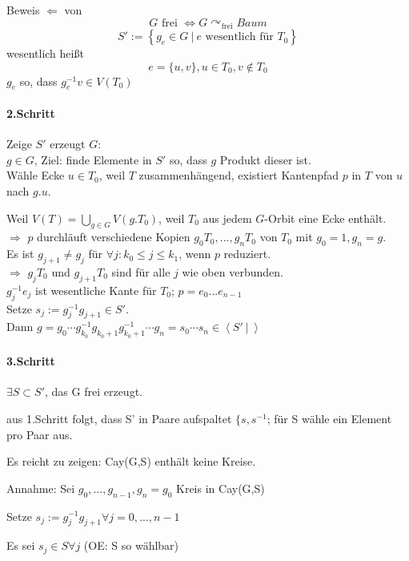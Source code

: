 \documentclass{article}
\newcommand{\set}[2]{\left\lbrace #1~|~#2 \right\rbrace}
\newcommand{\grp}[2]{\left\langle #1~|~#2 \right\rangle}
\begin{document}

Beweis $\Longleftarrow$ von 
\[G \text{ frei } \Longleftrightarrow G \curvearrowright_\text{frei} Baum \]
\[S' := \set{g_e \in G}{e \text{ wesentlich für }T_0} \]
wesentlich heißt
\[e = \{u,v\}, u \in T_0, v \notin T_0\]
$g_e$ so, dass $g_e^{-1} v \in V(T_0)$

\paragraph{2.Schritt}
Zeige $S'$ erzeugt $G$:\\

$g\in G$, Ziel: finde Elemente in $S'$ so, dass $g$ Produkt dieser ist.\\

Wähle Ecke $u \in T_0$, weil $T$ zusammenhängend, existiert Kantenpfad $p$ in $T$ von $u$ nach $g.u$.

Weil $V(T) = \bigcup_{g\in G} V(g.T_0)$, weil $T_0$ aus jedem $G$-Orbit eine Ecke enthält.\\
$\Longrightarrow$ $p$ durchläuft verschiedene Kopien $g_0T_0, ..., g_nT_0$ von $T_0$ mit $g_0 = 1, g_n = g$.\\
Es ist $g_{j+1} \neq g_j$ für $\forall j: k_0 \leq j \leq k_1$, wenn $p$ reduziert.\\
$\Rightarrow$ $g_jT_0$ und $g_{j+1}T_0$ sind für alle $j$ wie oben verbunden.\\
$g_j^{-1} e_j$ ist wesentliche Kante für $T_0$; $p = e_0...e_{n-1}$\\
Setze $s_j := g_j^{-1}g_{j+1} \in S'$.\\
Dann $g = g_0 \cdots g_{k_0}^{-1}g_{k_0 +1} g_{k_0 +1}^{-1} \cdots g_n = s_0 \cdots s_n \in \grp{S'}{}$

\paragraph{3.Schritt}
$\exists S \subset S'$, das G frei erzeugt.

aus 1.Schritt folgt, dass S' in Paare aufspaltet $\{s, s^{-1}$; für S wähle ein Element pro Paar aus.

Es reicht zu zeigen: Cay(G,S) enthält keine Kreise.

Annahme: Sei $g_0,\ldots, g_{n-1}, g_n = g_0$ Kreis in Cay(G,S)

Setze $s_j := g_j^{-1}g_{j+1} \forall j= 0, \ldots , n-1$

Es sei $s_j\in S \forall j$ (OE: S so wählbar)
\end{document}
